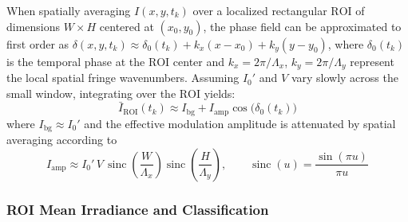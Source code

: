 When spatially averaging $I(x, y, t_k)$ over a localized rectangular $\text{ROI}$ of dimensions $W \times H$ centered at $(x_0, y_0)$, the phase field can be approximated to first order as $\delta(x, y, t_k) \approx \delta_0(t_k) + k_x(x - x_0) + k_y(y - y_0)$, where $\delta_0(t_k)$ is the temporal phase at the $\text{ROI}$ center and $k_x = 2\pi/\Lambda_x$, $k_y = 2\pi/\Lambda_y$ represent the local spatial fringe wavenumbers. Assuming $I_0'$ and $V$ vary slowly across the small window, integrating over the $\text{ROI}$ yields:
\begin{equation}
    \bar{I}_{\text{ROI}}(t_k) \approx I_{\text{bg}} + I_{\text{amp}}\cos\!\bigl(\delta_0(t_k)\bigr)
    \label{eq:roi_irradiance_model_justified}
\end{equation}
where $I_{\text{bg}} \approx I_0'$ and the effective modulation amplitude is attenuated by spatial averaging according to
\begin{equation}
    I_{\text{amp}} \approx I_0'\,V\,\operatorname{sinc}\!\left(\frac{W}{\Lambda_x}\right)\operatorname{sinc}\!\left(\frac{H}{\Lambda_y}\right), \qquad \operatorname{sinc}(u) = \frac{\sin(\pi u)}{\pi u}
    \label{eq:roi_sinc_attenuation}
\end{equation}

\subsubsection{ROI Mean Irradiance and Classification}

